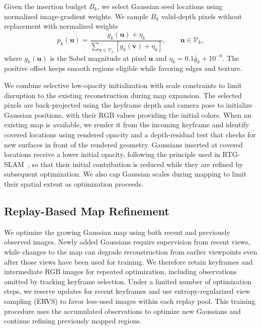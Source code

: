 Given the insertion budget $B_k$, we select Gaussian seed locations using normalized image-gradient weights.
We sample $B_k$ valid-depth pixels without replacement with normalized weights
\begin{equation}
  p_k(\mathbf u)=
  \frac{g_k(\mathbf u)+\eta_k}
       {\sum_{\mathbf v\in\mathcal V_k}[g_k(\mathbf v)+\eta_k]},
  \qquad \mathbf u\in\mathcal V_k,
  \label{eq:pip_init_sampling}
\end{equation}
where $g_k(\mathbf u)$ is the Sobel magnitude at pixel $\mathbf u$ and $\eta_k=0.1\bar g_k+10^{-6}$.
The positive offset keeps smooth regions eligible while favoring edges and texture.

We combine selective low-opacity initialization with scale constraints to limit disruption to the existing reconstruction during map expansion.
The selected pixels are back-projected using the keyframe depth and camera pose to initialize Gaussian positions, with their RGB values providing the initial colors.
When an existing map is available, we render it from the incoming keyframe and identify covered locations using rendered opacity and a depth-residual test that checks for new surfaces in front of the rendered geometry.
Gaussians inserted at covered locations receive a lower initial opacity, following the principle used in RTG-SLAM~\cite{rtgslam2024}, so that their initial contribution is reduced while they are refined by subsequent optimization.
We also cap Gaussian scales during mapping to limit their spatial extent as optimization proceeds.

\subsection{Replay-Based Map Refinement}
\label{ssec:pip_views}

We optimize the growing Gaussian map using both recent and previously observed images.
Newly added Gaussians require supervision from recent views, while changes to the map can degrade reconstruction from earlier viewpoints even after those views have been used for training.
We therefore retain keyframes and intermediate RGB images for repeated optimization, including observations omitted by tracking keyframe selection.
Under a limited number of optimization steps, we reserve updates for recent keyframes and use entropy-regularized view sampling (ERVS) to favor less-used images within each replay pool.
This training procedure uses the accumulated observations to optimize new Gaussians and continue refining previously mapped regions.

